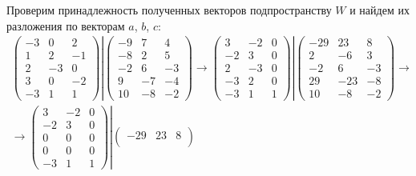 \documentclass[12pt]{article}
\begin{document}
    Проверим принадлежность полученных векторов подпространству $W$ и найдем их разложения по векторам $a$, $b$, $c$:
    \begin{gather*}
        \left .
        \begin{pmatrix}
            -3 & 0  & 2  \\
            1  & 2  & -1 \\
            2  & -3 & 0  \\
            3  & 0  & -2 \\
            -3 & 1  & 1
        \end{pmatrix}
        \right |
        \begin{pmatrix}
            -9 & 7  & 4  \\
            -8 & 2  & 5  \\
            -2 & 6  & -3 \\
            9  & -7 & -4 \\
            10 & -8 & -2
        \end{pmatrix}
        \rightarrow
        \left .
        \begin{pmatrix}
            3  & -2 & 0 \\
            -2 & 3  & 0 \\
            2  & -3 & 0 \\
            -3 & 2  & 0 \\
            -3 & 1  & 1
        \end{pmatrix}
        \right |
        \begin{pmatrix}
            -29 & 23  & 8  \\
            2   & -6  & 3  \\
            -2  & 6   & -3 \\
            29  & -23 & -8 \\
            10  & -8  & -2
        \end{pmatrix}
        \rightarrow \\
        \rightarrow
        \left .
        \begin{pmatrix}
            3  & -2 & 0 \\
            -2 & 3  & 0 \\
            0  & 0  & 0 \\
            0  & 0  & 0 \\
            -3 & 1  & 1
        \end{pmatrix}
        \right |
        \begin{pmatrix}
            -29 & 23 & 8  \\

\end{pmatrix}
\end{gather*}
\end{document}
